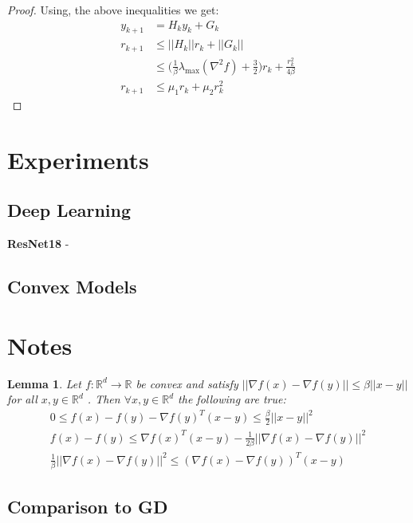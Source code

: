 \documentclass[12pt,twoside]{article}
\newtheorem{lemma}{Lemma}
\begin{document}
\begin{proof}
Using, the above inequalities we get:
\begin{equation}
\begin{aligned}
y_{k+1} &= H_k y_k + G_k \\
r_{k+1} & \leq  ||H_k|| r_k + ||G_k|| \\
& \leq \big(\frac{1}{\beta} \lambda_{\max}(\nabla^2 f) + \frac{3}{2} \big)r_k + \frac{r_k^2}{4\beta} \\
r_{k+1} & \leq \mu_1 r_k + \mu_2 r_k^2
\end{aligned}
\end{equation}
\end{proof}


\section{Experiments}
\subsection{Deep Learning}

\textbf{ResNet18} -

\subsection{Convex Models}
\section{Notes}
\begin{lemma}
Let $f : \mathbb{R}^d \rightarrow \mathbb{R}$  be convex and satisfy $|| \nabla f(x) - \nabla f(y) || \leq \beta || x -y ||$ for all $x,y \in \mathbb{R}^d$ . Then $\forall x,y \in \mathbb{R}^d$ the following are true:
\begin{align}
0 \leq f(x) - f(y) - \nabla f(y)^T (x-y) \leq \frac{\beta}{2} || x-y ||^2 \\
f(x) - f(y) \leq \nabla f(x)^T (x-y) - \frac{1}{2 \beta} || \nabla f(x) - \nabla f(y) ||^2 \\
\frac{1}{\beta} || \nabla f(x) - \nabla f(y) ||^2  \leq( \nabla f(x) - \nabla f(y))^T(x-y)
\end{align}
\end{lemma}
\subsection{Comparison to GD}
\end{document}
